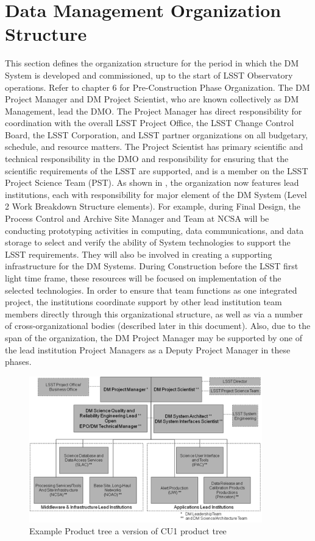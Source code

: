 

\section{Data Management Organization Structure}
This section defines the organization structure for the period in which the DM System is developed and commissioned, up to the start of LSST Observatory operations.  Refer to chapter 6 for Pre-Construction Phase Organization.
The DM Project Manager and DM Project Scientist, who are known collectively as DM Management, lead the DMO.  The Project Manager has direct responsibility for coordination with the overall LSST Project Office, the LSST Change Control Board, the LSST Corporation, and LSST partner organizations on all budgetary, schedule, and resource matters.  The Project Scientist has primary scientific and technical responsibility in the DMO and responsibility for ensuring that the scientific requirements of the LSST are supported, and is a member on the LSST Project Science Team (PST). 
As shown in , the organization now features lead institutions, each with responsibility for major element of the DM System (Level 2 Work Breakdown Structure elements).  For example, during Final Design, the Process Control and Archive Site Manager and Team at NCSA will be conducting prototyping activities in computing, data communications, and data storage to select and verify the ability of System technologies to support the LSST requirements.  They will also be involved in creating a supporting infrastructure for the DM Systems.  During Construction before the LSST first light time frame, these resources will be focused on implementation of the selected technologies.  In order to ensure that team functions as one integrated project, the institutions coordinate support by other lead institution team members directly through this organizational structure, as well as via a number of cross-organizational bodies (described later in this document). 
Also, due to the span of the organization, the DM Project Manager may be supported by one of the lead institution Project Managers as a Deputy Project Manager in these phases.

\begin{figure}[htbp]
\begin{center}
 \includegraphics[width=0.9\textwidth]{images/dmorg}
\caption{Example Product tree a version of  CU1 product tree \label{fig:dmorg}}
\end{center}
\end{figure}

